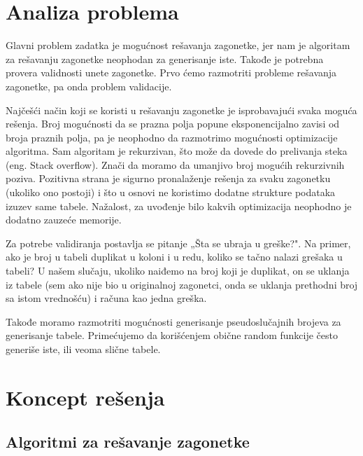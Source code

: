 \documentclass[a4paper]{article}
\begin{document}
    \section{Analiza problema}
    \par Glavni problem zadatka je mogućnost rešavanja zagonetke, jer nam je algoritam za rešavanju zagonetke neophodan za generisanje iste. Takođe je potrebna provera
    validnosti unete zagonetke. Prvo ćemo razmotriti probleme rešavanja zagonetke, pa onda problem validacije.
    \par Najčešći način koji se koristi u rešavanju zagonetke je isprobavajući svaka moguća rešenja. Broj mogućnosti da se prazna polja popune eksponencijalno zavisi od broja praznih polja, pa je
    neophodno da razmotrimo mogućnosti optimizacije algoritma. Sam algoritam je rekurzivan, što može da dovede do 
    prelivanja steka (eng. Stack overflow). Znači da moramo da umanjivo broj mogućih rekurzivnih poziva. Pozitivna strana je sigurno pronalaženje 
    rešenja za svaku zagonetku (ukoliko ono postoji) i što u osnovi ne koristimo dodatne strukture podataka izuzev same tabele. Nažalost, za uvođenje bilo kakvih optimizacija neophodno je
    dodatno zauzeće memorije.
    \par Za potrebe validiranja postavlja se pitanje „Šta se ubraja u greške?". Na primer, ako je broj u tabeli duplikat u koloni i u redu, koliko se tačno nalazi grešaka u tabeli?
    U našem slučaju, ukoliko naiđemo na broj koji je duplikat, on se uklanja iz tabele (sem ako nije bio u originalnoj zagonetci, onda se uklanja prethodni broj sa istom vrednošću) i računa kao jedna greška.
    \par Takođe moramo razmotriti mogućnosti generisanje pseudoslučajnih brojeva za generisanje tabele. Primećujemo da korišćenjem obične random funkcije često generiše iste,
    ili veoma slične tabele.
    \newpage

    \section{Koncept rešenja}
    
    \subsection{Algoritmi za rešavanje zagonetke}
\end{document}
